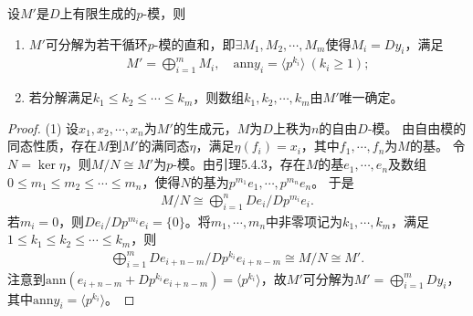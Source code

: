 \documentclass[../../main.tex]{subfiles}%
\begin{document}
\begin{theorem}
设$M'$是$D$上有限生成的$p$-模，则
\begin{enumerate}[(1)]
\item $M'$可分解为若干循环$p$-模的直和，即$\exists M_1,M_2,\cdots,M_m$使得$M_i=Dy_i$，满足
\begin{align*}
M'=\bigoplus\limits_{i=1}^{m}M_i,\quad \mathrm{ann}y_i=\langle p^{k_i}\rangle\ (k_i\geqslant1);
\end{align*}
\item 若分解满足$k_1\leqslant k_2\leqslant\cdots\leqslant k_m$，则数组$k_1,k_2,\cdots,k_m$由$M'$唯一确定。
\end{enumerate}
\end{theorem}
\begin{proof}

(1) 设$x_1,x_2,\cdots,x_n$为$M'$的生成元，$M$为$D$上秩为$n$的自由$D$-模。
由自由模的同态性质，存在$M$到$M'$的满同态$\eta$，满足$\eta(f_i)=x_i$，其中$f_1,\cdots,f_n$为$M$的基。
令$N=\ker\eta$，则$M/N\cong M'$为$p$-模。由引理5.4.3，存在$M$的基$e_1,\cdots,e_n$及数组$0\leqslant m_1\leqslant m_2\leqslant\cdots\leqslant m_n$，使得$N$的基为$p^{m_1}e_1,\cdots,p^{m_n}e_n$。
于是
\begin{align*}
M/N\cong\bigoplus\limits_{i=1}^{n}De_i/Dp^{m_i}e_i.
\end{align*}
若$m_i=0$，则$De_i/Dp^{m_i}e_i=\{0\}$。将$m_1,\cdots,m_n$中非零项记为$k_1,\cdots,k_m$，满足$1\leqslant k_1\leqslant k_2\leqslant\cdots\leqslant k_m$，则
\begin{align*}
\bigoplus\limits_{i=1}^{m}De_{i+n-m}/Dp^{k_i}e_{i+n-m}\cong M/N\cong M'.
\end{align*}
注意到$\mathrm{ann}(e_{i+n-m}+Dp^{k_i}e_{i+n-m})=\langle p^{k_i}\rangle$，故$M'$可分解为$M'=\bigoplus\limits_{i=1}^{m}Dy_i$，其中$\mathrm{ann}y_i=\langle p^{k_i}\rangle$。


\end{proof}
\end{document}
